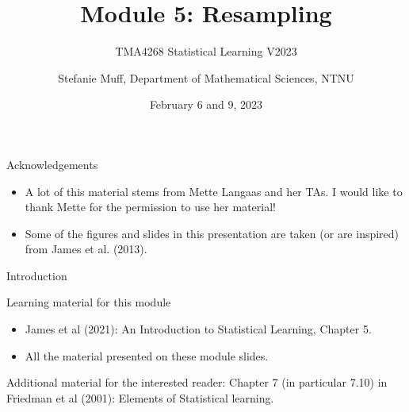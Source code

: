 \documentclass[
  10pt,
  ignorenonframetext,
]{beamer}
\title{Module 5: Resampling}
\subtitle{TMA4268 Statistical Learning V2023}
\author{Stefanie Muff, Department of Mathematical Sciences, NTNU}
\date{February 6 and 9, 2023}
\begin{document}
\frame{\titlepage}

\begin{frame}{Acknowledgements}
\protect\hypertarget{acknowledgements}{}
\begin{itemize}
\item
  A lot of this material stems from Mette Langaas and her TAs. I would
  like to thank Mette for the permission to use her material!
\item
  Some of the figures and slides in this presentation are taken (or are
  inspired) from James et al. (2013).
\end{itemize}
\end{frame}

\begin{frame}{Introduction}
\protect\hypertarget{introduction}{}
\begin{block}{Learning material for this module}
\protect\hypertarget{learning-material-for-this-module}{}
\vspace{2mm}

\begin{itemize}
\item
  James et al (2021): An Introduction to Statistical Learning, Chapter
  5.
\item
  All the material presented on these module slides.
\end{itemize}

\vspace{2mm}

Additional material for the interested reader: Chapter 7 (in particular
7.10) in Friedman et al (2001): Elements of Statistical learning.
\end{block}
\end{frame}
\end{document}
